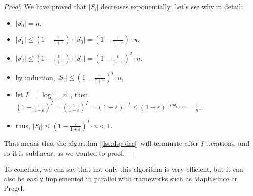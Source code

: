 \begin{proof}
    We have proved that $|S_i|$ decreases exponentially. Let's see why in detail:
    \begin{itemize}
        \item $|S_0| = n$,
        \item $|S_1| \leq \left(1 - \frac{\varepsilon}{1+\varepsilon}\right) \cdot |S_0| = \left(1 - \frac{\varepsilon}{1+\varepsilon}\right) \cdot n$,
        \item $|S_2| \leq \left(1 - \frac{\varepsilon}{1+\varepsilon}\right) \cdot |S_1| = \left(1 - \frac{\varepsilon}{1+\varepsilon}\right)^2 \cdot n$,
        \item by induction, $|S_i| \leq \left(1 - \frac{\varepsilon}{1+\varepsilon}\right)^i \cdot n$,
        \item let $I = \lceil \log_{i+\varepsilon} n \rceil$, then $\left(1 - \frac{\varepsilon}{1+\varepsilon}\right)^I = \left( \frac{1}{1 + \varepsilon} \right)^I = (1+\varepsilon)^{-I} \leq (1+\varepsilon)^{-log_{1+\varepsilon n}} = \frac{1}{n}$,
        \item thus, $|S_I| \leq \left(1 - \frac{\varepsilon}{1+\varepsilon}\right)^I \cdot n < 1$.
    \end{itemize}
    That means that the algorithm [\ref{lst:dsp-dse}] will terminate after $I$ iterations, and so it is sublinear, as we wanted to proof.
\end{proof}

To conclude, we can say that not only this algorithm is very efficient, but it can also be easily implemented in parallel with frameworks such as MapReduce or Pregel.







